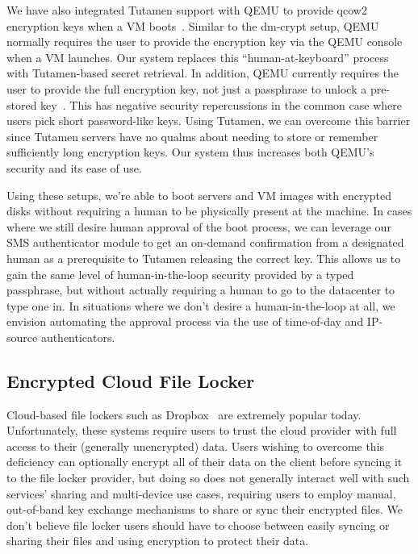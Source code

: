 We have also integrated Tutamen support with QEMU to provide qcow2
encryption keys when a VM boots~\cite{src-qemu-tutamen}. Similar to
the dm-crypt setup, QEMU normally requires the user to provide the
encryption key via the QEMU console when a VM launches. Our system
replaces this ``human-at-keyboard'' process with Tutamen-based secret
retrieval. In addition, QEMU currently requires the user to provide
the full encryption key, not just a passphrase to unlock a pre-stored
key~\cite{berrange-qemucrypto}. This has negative security
repercussions in the common case where users pick short password-like
keys. Using Tutamen, we can overcome this barrier since Tutamen
servers have no qualms about needing to store or remember sufficiently
long encryption keys. Our system thus increases both QEMU's security
and its ease of use.

Using these setups, we're able to boot servers and VM images with
encrypted disks without requiring a human to be physically present at
the machine. In cases where we still desire human approval of the boot
process, we can leverage our SMS authenticator module to get an
on-demand confirmation from a designated human as a prerequisite to
Tutamen releasing the correct key. This allows us to gain the same
level of human-in-the-loop security provided by a typed passphrase,
but without actually requiring a human to go to the datacenter to type
one in. In situations where we don't desire a human-in-the-loop at
all, we envision automating the approval process via the use of
time-of-day and IP-source authenticators.

\subsection{Encrypted Cloud File Locker}

Cloud-based file lockers such as Dropbox~\cite{dropbox} are extremely
popular today. Unfortunately, these systems require users to trust the
cloud provider with full access to their (generally unencrypted)
data. Users wishing to overcome this deficiency can optionally encrypt
all of their data on the client before syncing it to the file locker
provider, but doing so does not generally interact well with such
services' sharing and multi-device use cases, requiring users to
employ manual, out-of-band key exchange mechanisms to share or sync
their encrypted files. We don't believe file locker users should have
to choose between easily syncing or sharing their files and using
encryption to protect their data.

